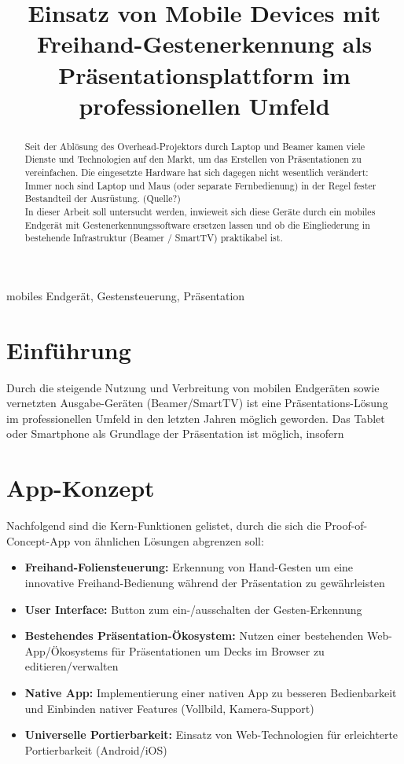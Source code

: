\documentclass{article}
\title{Einsatz von Mobile Devices mit Freihand-Gestenerkennung als Präsentationsplattform im professionellen Umfeld}
\begin{document}

\maketitle

\begin{abstract}
Seit der Ablösung des Overhead-Projektors durch Laptop und Beamer kamen viele Dienste und Technologien auf den Markt, um das Erstellen von Präsentationen zu vereinfachen. 
Die eingesetzte Hardware hat sich dagegen nicht wesentlich verändert: 
Immer noch sind Laptop und Maus (oder separate Fernbedienung) in der Regel fester Bestandteil der Ausrüstung. (Quelle?) \\
In dieser Arbeit soll untersucht werden, inwieweit sich diese Geräte durch ein mobiles Endgerät mit Gestenerkennungssoftware ersetzen lassen und ob die Eingliederung in bestehende Infrastruktur (Beamer / SmartTV) praktikabel ist.

\end{abstract}
%
\begin{keywords}
mobiles Endgerät, Gestensteuerung, Präsentation
\end{keywords}
%
\section{Einführung}
\label{sec:intro}
Durch die steigende Nutzung und Verbreitung von mobilen Endgeräten sowie vernetzten Ausgabe-Geräten (Beamer/SmartTV) 
ist eine Präsentations-Lösung im professionellen Umfeld in den letzten Jahren möglich geworden. Das Tablet oder Smartphone als Grundlage der Präsentation ist möglich, insofern  

\section{App-Konzept}
Nachfolgend sind die Kern-Funktionen gelistet, durch die sich die Proof-of-Concept-App von ähnlichen Lösungen abgrenzen soll:

\begin{itemize}
\item \textbf{Freihand-Foliensteuerung:} Erkennung von Hand-Gesten um eine innovative Freihand-Bedienung während der Präsentation zu gewährleisten
\item \textbf{User Interface:} Button zum ein-/ausschalten der Gesten-Erkennung
\item \textbf{Bestehendes Präsentation-Ökosystem:} Nutzen einer bestehenden Web-App/Ökosystems für Präsentationen um Decks im Browser zu editieren/verwalten
\item \textbf{Native App:} Implementierung  einer nativen App zu besseren Bedienbarkeit und Einbinden nativer Features (Vollbild, Kamera-Support)
\item \textbf{Universelle Portierbarkeit:} Einsatz von Web-Technologien für erleichterte Portierbarkeit (Android/iOS)
\end{itemize}
\end{document}
